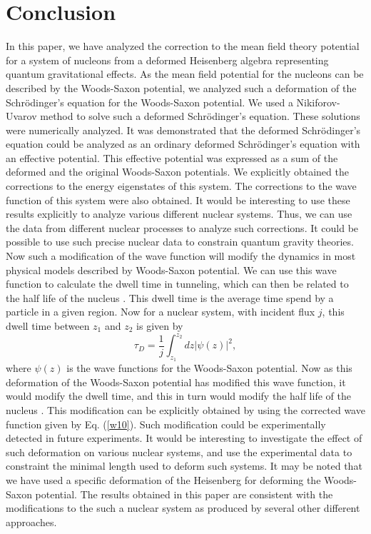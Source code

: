 \documentclass[12pt]{article}
\begin{document}
\section{Conclusion}
In this paper, we  have analyzed the correction to the  mean field theory potential for a system of  nucleons from a deformed Heisenberg algebra representing quantum gravitational effects. As the mean field potential for the nucleons can be described by the Woods-Saxon potential, we analyzed such a deformation of  the Schr\"{o}dinger's equation  for the Woods-Saxon potential. We used a Nikiforov-Uvarov method to solve such a deformed  Schr\"{o}dinger's equation. These solutions were numerically analyzed. It was demonstrated that the deformed  Schr\"{o}dinger's equation could be analyzed as an ordinary deformed  Schr\"{o}dinger's equation with an effective potential. This effective potential was expressed as a sum of the deformed and the original Woods-Saxon potentials. We explicitly obtained the corrections to the energy eigenstates of this system. The corrections to the wave function of this system were also obtained. 
It would be interesting to use these results explicitly to analyze various different nuclear systems. Thus, we can use the data from different nuclear processes to analyze such corrections. It could be possible to use such precise nuclear data to constrain quantum gravity theories. Now such a modification of the wave function will modify the dynamics in most physical models described by Woods-Saxon potential. We can use this wave function to calculate the dwell
time in tunneling, which can then be related to the half life of the  nucleus  \cite{k9, k10, k12, k14}. 
This  dwell time is the average time spend by a particle in a given region. 
Now for a nuclear system, with  incident flux $j$, this dwell time  between $z_1$ and $z_2$ is given by  \cite{k9, k10}
\begin{equation}
\tau_D = \frac{1}{j}\int_{z_1}^{z_2} dz |\psi(z)|^2, 
\end{equation}
where $\psi(z)$ is the  wave functions for the      Woods-Saxon  potential.  Now as this deformation of the Woods-Saxon  potential  has modified this wave function, it would modify the dwell time, and this in turn would modify the half life of the  nucleus  \cite{k9, k10, k12, k14}. This modification can be explicitly obtained by using the corrected wave function    given by Eq. (\ref{w10}).
Such modification could be experimentally detected in future experiments. It would be interesting to investigate the effect of such deformation on various nuclear systems, and use the experimental data to constraint the minimal length used to deform such systems. It may be noted that we have used a specific  deformation of the   Heisenberg \cite{line12, line14,bb1,bb2,bb3,bb4,bb5,bb6,bb7, line16, line18} for deforming the Woods-Saxon potential. The results obtained in this paper are consistent with the modifications to the such a nuclear system as produced by several other different approaches. 
\end{document}
